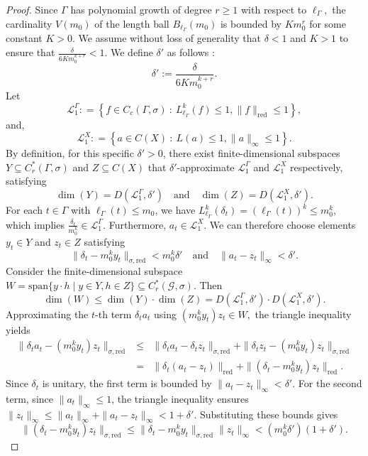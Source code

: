 \documentclass[a4paper,11pt,reqno]{amsart}
\theoremstyle{plain}
\theoremstyle{mainthmstyle}
\theoremstyle{named}
\numberwithin{equation}{section}
\newcommand{\Bea}{\begin{eqnarray*}}
\newcommand{\Eea}{\end{eqnarray*}}
\begin{document}
\begin{proof}
Since $\Gamma$ has polynomial growth of degree $r \geq 1$ with respect to $\ell_{\Gamma},$ the cardinality $V \left (m_0 \right )$ of the length ball $B_{\ell_{\Gamma}} (m_0)$ is bounded by $K m_0^{r}$ for some constant $K > 0.$ We assume without loss of generality that $\delta < 1$ and $K > 1$ to ensure that $\frac{\delta}{6 K m_0^{k + r}} < 1$. We define $\delta'$ as follows $:$
$$\delta' := \frac{\delta}{6 K m_0^{k + r}}.$$
Let $$\mathcal L_1^{\Gamma} : = \left \{f \in C_c (\Gamma, \sigma)\ :\ L_{\ell_{\Gamma}}^{k} (f) \leq 1, \|f\|_{\mathrm {red}} \leq 1 \right \},$$
and, $$\mathcal L_1^{X} : = \left \{a \in C(X)\ :\ L(a) \leq 1, \|a\|_{\infty} \leq 1 \right \}.$$
By definition, for this specific $\delta' > 0$, there exist finite-dimensional subspaces $Y \subseteq C_r^*(\Gamma, \sigma)$ and $Z \subseteq C(X)$ that $\delta'$-approximate $\mathcal{L}_1^{\Gamma}$ and $\mathcal{L}_1^X$ respectively, satisfying
$$\dim(Y) = D(\mathcal{L}_1^{\Gamma}, \delta') \quad \text{and} \quad \dim(Z) = D(\mathcal{L}_1^X, \delta').$$
For each $t \in \Gamma$ with $\ell_{\Gamma} (t) \le m_0$, we have $L_{\ell_{\Gamma}}^k(\delta_t) = (\ell_{\Gamma} (t))^k \le m_0^k$, which implies $\frac{\delta_t}{m_0^k} \in \mathcal{L}_1^{\Gamma}.$ Furthermore, $a_t \in \mathcal{L}_1^X$. We can therefore choose elements $y_t \in Y$ and $z_t \in Z$ satisfying
$$\|\delta_t - m_0^k y_t\|_{\sigma, \mathrm{red}} < m_0^k \delta' \quad \text{and} \quad \|a_t - z_t\|_{\infty} < \delta'.$$
Consider the finite-dimensional subspace $W = \mathrm{span}\{ y \cdot h \mid y \in Y, h \in Z \} \subseteq C_r^*(\mathcal{G}, \sigma)$. Then
$$\dim(W) \le \dim(Y) \cdot \dim(Z) = D(\mathcal{L}_1^{\Gamma}, \delta') \cdot D(\mathcal{L}_1^X, \delta').$$
Approximating the $t$-th term $\delta_t a_t$ using $(m_0^k y_t) z_t \in W,$ the triangle inequality yields
\Bea
    \| \delta_t a_t - (m_0^k y_t) z_t \|_{\sigma, \mathrm{red}} & \leq & \| \delta_t a_t - \delta_t z_t \|_{\sigma, \mathrm{red}} + \|\delta_t z_t - (m_0^k y_t) z_t \|_{\sigma, \mathrm{red}} \\
    & = & \| \delta_t (a_t - z_t) \|_{\mathrm{red}} + \| (\delta_t - m_0^k y_t) z_t \|_{\mathrm{red}}.
\Eea
Since $\delta_t$ is unitary, the first term is bounded by $\|a_t - z_t\|_{\infty} < \delta'$. For the second term, since $\|a_t\|_{\infty} \le 1$, the triangle inequality ensures $\|z_t\|_{\infty} \le \|a_t\|_{\infty} + \|a_t - z_t\|_{\infty} < 1 + \delta'$. Substituting these bounds gives
$$\| (\delta_t - m_0^k y_t) z_t \|_{\sigma, \mathrm{red}} \le \| \delta_t - m_0^k y_t \|_{\sigma, \mathrm{red}} \| z_t \|_{\infty} < (m_0^k \delta')(1 + \delta').$$

\end{proof}
\end{document}
